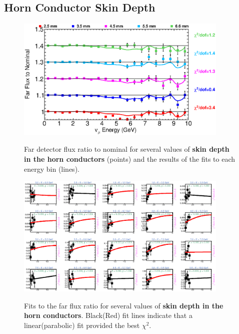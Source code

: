 \clearpage
\subsection{Horn Conductor Skin Depth}

\begin{figure}[ht]
  \begin{center}
    {\includegraphics[width=4.0in]{figures/SkinDepthIC__far_summary.eps}}
  \end{center}
\caption{ Far detector flux ratio to nominal for several values of {\bf skin depth in the horn conductors} (points) and the results of the fits to each energy bin (lines).}
\end{figure}

\begin{figure}[hb]
  \begin{center}
    {\includegraphics[width=4.0in]{figures/SkinDepthIC__far_fits.eps}}
  \end{center}
\caption{ Fits to the far flux ratio for several values of {\bf skin depth in the horn conductors}. Black(Red) fit lines indicate that a linear(parabolic) fit provided the best $\chi^2$. }
\end{figure}

